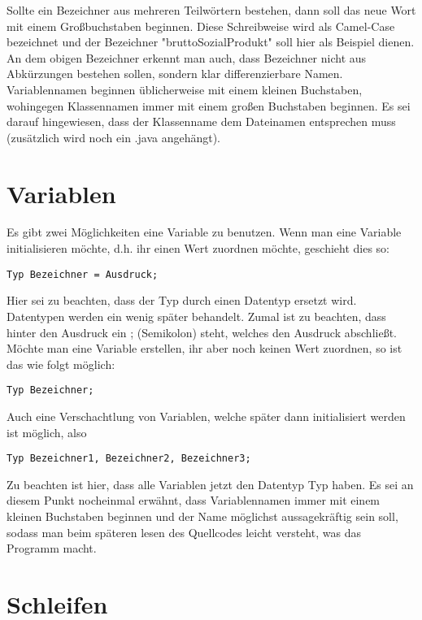 Sollte ein Bezeichner aus mehreren Teilwörtern bestehen, dann soll das neue Wort mit einem Großbuchstaben beginnen. Diese Schreibweise wird als Camel-Case bezeichnet und der Bezeichner "bruttoSozialProdukt" soll hier als Beispiel dienen.
An dem obigen Bezeichner erkennt man auch, dass Bezeichner nicht aus Abkürzungen bestehen sollen, sondern klar differenzierbare Namen. Variablennamen beginnen üblicherweise mit einem kleinen Buchstaben, wohingegen Klassennamen immer mit einem großen Buchstaben beginnen. Es sei darauf hingewiesen, dass der Klassenname dem Dateinamen entsprechen muss (zusätzlich wird noch ein .java angehängt).

\section{Variablen}

Es gibt zwei Möglichkeiten eine Variable zu benutzen. Wenn man eine Variable initialisieren möchte, d.h. ihr einen Wert zuordnen möchte, geschieht dies so:

\begin{verbatim}
Typ Bezeichner = Ausdruck;
\end{verbatim}

Hier sei zu beachten, dass der Typ durch einen Datentyp ersetzt wird. Datentypen werden ein wenig später behandelt. Zumal ist zu beachten, dass hinter den Ausdruck ein ; (Semikolon) steht, welches den Ausdruck abschließt. Möchte man eine Variable erstellen, ihr aber noch keinen Wert zuordnen, so ist das wie folgt möglich:

\begin{verbatim}
Typ Bezeichner;
\end{verbatim}

Auch eine Verschachtlung von Variablen, welche später dann initialisiert werden ist möglich, also

\begin{verbatim}
Typ Bezeichner1, Bezeichner2, Bezeichner3;
\end{verbatim}

Zu beachten ist hier, dass alle Variablen jetzt den Datentyp Typ haben. Es sei an diesem Punkt nocheinmal erwähnt, dass Variablennamen immer mit einem kleinen Buchstaben beginnen und der Name möglichst aussagekräftig sein soll, sodass man beim späteren lesen des Quellcodes leicht versteht, was das Programm macht.

\section{Schleifen}
